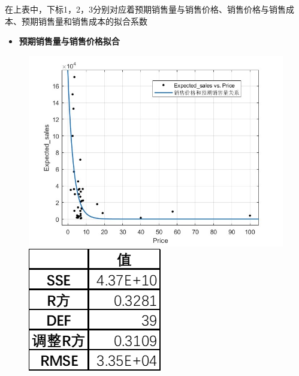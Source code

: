 \documentclass[withoutpreface,bwprint]{cumcmthesis} %
\begin{document}
在上表中，下标1，2，3分别对应着预期销售量与销售价格、销售价格与销售成本、预期销售量和销售成本的拟合系数
\begin{itemize}
	\item \textbf{预期销售量与销售价格拟合}
\end{itemize}


\begin{figure}[H]
	\centering
	\begin{minipage}[c]{0.48\textwidth}
		\centering
		\includegraphics[height=0.2\textheight]{销售量和销售价格}
	\end{minipage}
	\begin{minipage}[c]{0.48\textwidth}
		\centering
		\includegraphics[height=0.2\textheight]{111}
	\end{minipage}
\end{figure}
\end{document}
